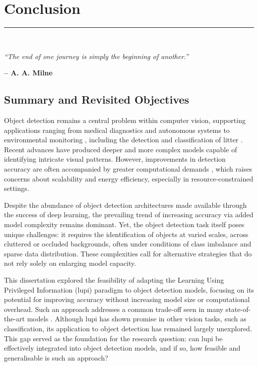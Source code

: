\graphicspath{{content/chapters/6_conclusion/figures/}}

\chapter{Conclusion}%
\label{chp:conclusion}
\rule{\textwidth}{1pt} \\[1ex]

\epigraph{\textit{``The end of one journey is simply the beginning of another.''}}{\textbf{-- A. A. Milne}}

\section{Summary and Revisited Objectives}
\label{sec:6_summary_objectives}

Object detection remains a central problem within computer vision, supporting applications ranging from medical diagnostics \cite{application_med2} and autonomous systems \cite{application_automation2} to environmental monitoring \cite{application_environment2}, including the detection and classification of litter \cite{soda_dataset}. Recent advances have produced deeper and more complex models capable of identifying intricate visual patterns. However, improvements in detection accuracy are often accompanied by greater computational demands \cite{detr, rt-detr}, which raises concerns about scalability and energy efficiency, especially in resource-constrained settings.

Despite the abundance of object detection architectures made available through the success of deep learning, the prevailing trend of increasing accuracy via added model complexity remains dominant. Yet, the object detection task itself poses unique challenges: it requires the identification of objects at varied scales, across cluttered or occluded backgrounds, often under conditions of class imbalance and sparse data distribution. These complexities call for alternative strategies that do not rely solely on enlarging model capacity.

This dissertation explored the feasibility of adapting the Learning Using Privileged Information (\gls{lupi}) paradigm to object detection models, focusing on its potential for improving accuracy without increasing model size or computational overhead. Such an approach addresses a common trade-off seen in many state-of-the-art models \cite{yolov12, rt-detrv2}. Although \gls{lupi} has shown promise in other vision tasks, such as classification, its application to object detection has remained largely unexplored. This gap served as the foundation for the research question: can \gls{lupi} be effectively integrated into object detection models, and if so, how feasible and generalisable is such an approach?

